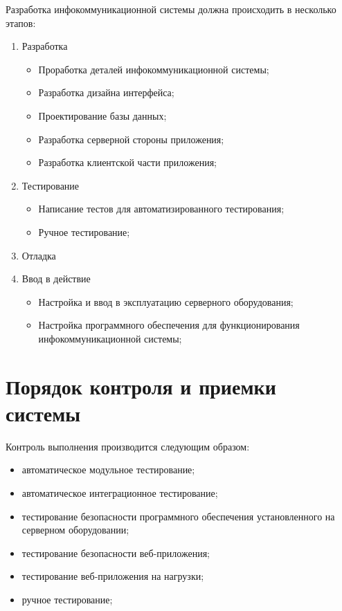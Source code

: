 \documentclass[14pt]{extreport}
\begin{document}
        Разработка инфокоммуникационной системы должна происходить в несколько этапов:
        \begin{enumerate}
            \item Разработка \begin{itemize}
                \item Проработка деталей инфокоммуникационной системы;
                \item Разработка дизайна интерфейса;
                \item Проектирование базы данных;
                \item Разработка серверной стороны приложения; 
                \item Разработка клиентской части приложения;
            \end{itemize}
            \item Тестирование \begin{itemize}
                \item Написание тестов для автоматизированного тестирования;
                \item Ручное тестирование;
            \end{itemize}
            \item Отладка 
            \item Ввод в действие \begin{itemize}
                \item Настройка и ввод в эксплуатацию серверного оборудования;
                \item Настройка программного обеспечения для функционирования инфокоммуникационной системы;
            \end{itemize}
        \end{enumerate}

\section{Порядок контроля и приемки системы} 
    Контроль выполнения производится следующим образом:
    \begin{itemize}
        \item автоматическое модульное тестирование;
        \item автоматическое интеграционное тестирование;
        \item тестирование безопасности программного обеспечения установленного на серверном оборудовании;
        \item тестирование безопасности веб-приложения;
        \item тестирование веб-приложения на нагрузки;
        \item ручное тестирование;
        \end{itemize}
\end{document}
